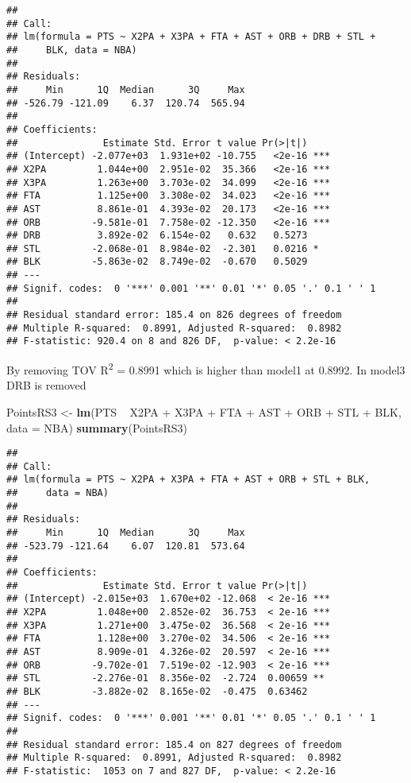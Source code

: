 \documentclass[]{article}
\newenvironment{Shaded}{\begin{snugshade}}{\end{snugshade}}
\newcommand{\KeywordTok}[1]{\textcolor[rgb]{0.13,0.29,0.53}{\textbf{{#1}}}}
\newcommand{\DataTypeTok}[1]{\textcolor[rgb]{0.13,0.29,0.53}{{#1}}}
\newcommand{\StringTok}[1]{\textcolor[rgb]{0.31,0.60,0.02}{{#1}}}
\newcommand{\NormalTok}[1]{{#1}}
\begin{document}
\begin{verbatim}
## 
## Call:
## lm(formula = PTS ~ X2PA + X3PA + FTA + AST + ORB + DRB + STL + 
##     BLK, data = NBA)
## 
## Residuals:
##     Min      1Q  Median      3Q     Max 
## -526.79 -121.09    6.37  120.74  565.94 
## 
## Coefficients:
##               Estimate Std. Error t value Pr(>|t|)    
## (Intercept) -2.077e+03  1.931e+02 -10.755   <2e-16 ***
## X2PA         1.044e+00  2.951e-02  35.366   <2e-16 ***
## X3PA         1.263e+00  3.703e-02  34.099   <2e-16 ***
## FTA          1.125e+00  3.308e-02  34.023   <2e-16 ***
## AST          8.861e-01  4.393e-02  20.173   <2e-16 ***
## ORB         -9.581e-01  7.758e-02 -12.350   <2e-16 ***
## DRB          3.892e-02  6.154e-02   0.632   0.5273    
## STL         -2.068e-01  8.984e-02  -2.301   0.0216 *  
## BLK         -5.863e-02  8.749e-02  -0.670   0.5029    
## ---
## Signif. codes:  0 '***' 0.001 '**' 0.01 '*' 0.05 '.' 0.1 ' ' 1
## 
## Residual standard error: 185.4 on 826 degrees of freedom
## Multiple R-squared:  0.8991, Adjusted R-squared:  0.8982 
## F-statistic: 920.4 on 8 and 826 DF,  p-value: < 2.2e-16
\end{verbatim}

By removing TOV R\textsuperscript{2} = 0.8991 which is higher than
model1 at 0.8992. In model3 DRB is removed

\begin{Shaded}
\begin{Highlighting}[]
\NormalTok{PointsRS3 <-}\StringTok{ }\KeywordTok{lm}\NormalTok{(PTS ~}\StringTok{ }\NormalTok{X2PA +}\StringTok{ }\NormalTok{X3PA +}\StringTok{ }\NormalTok{FTA +}\StringTok{ }\NormalTok{AST +}\StringTok{ }\NormalTok{ORB +}\StringTok{ }\NormalTok{STL +}\StringTok{ }\NormalTok{BLK, }\DataTypeTok{data =} \NormalTok{NBA)}
\KeywordTok{summary}\NormalTok{(PointsRS3)}
\end{Highlighting}
\end{Shaded}

\begin{verbatim}
## 
## Call:
## lm(formula = PTS ~ X2PA + X3PA + FTA + AST + ORB + STL + BLK, 
##     data = NBA)
## 
## Residuals:
##     Min      1Q  Median      3Q     Max 
## -523.79 -121.64    6.07  120.81  573.64 
## 
## Coefficients:
##               Estimate Std. Error t value Pr(>|t|)    
## (Intercept) -2.015e+03  1.670e+02 -12.068  < 2e-16 ***
## X2PA         1.048e+00  2.852e-02  36.753  < 2e-16 ***
## X3PA         1.271e+00  3.475e-02  36.568  < 2e-16 ***
## FTA          1.128e+00  3.270e-02  34.506  < 2e-16 ***
## AST          8.909e-01  4.326e-02  20.597  < 2e-16 ***
## ORB         -9.702e-01  7.519e-02 -12.903  < 2e-16 ***
## STL         -2.276e-01  8.356e-02  -2.724  0.00659 ** 
## BLK         -3.882e-02  8.165e-02  -0.475  0.63462    
## ---
## Signif. codes:  0 '***' 0.001 '**' 0.01 '*' 0.05 '.' 0.1 ' ' 1
## 
## Residual standard error: 185.4 on 827 degrees of freedom
## Multiple R-squared:  0.8991, Adjusted R-squared:  0.8982 
## F-statistic:  1053 on 7 and 827 DF,  p-value: < 2.2e-16
\end{verbatim}
\end{document}
